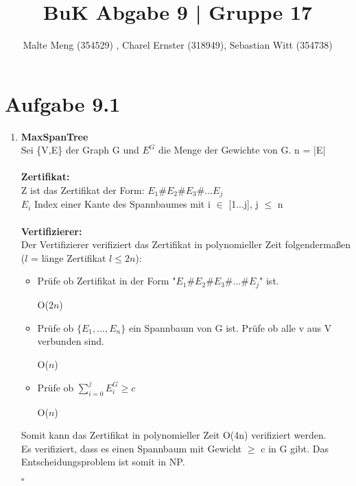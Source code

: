 \documentclass{article}
\title{BuK Abgabe 9 | Gruppe 17}
\author{Malte Meng (354529) , Charel Ernster (318949), Sebastian Witt (354738)}
\begin{document}
	\maketitle 
	\section[a 9.1]{Aufgabe 9.1}
	\begin{enumerate}[label=(\alph*).]
		\item \textbf{MaxSpanTree}\\
		Sei \{V,E\} der Graph G und $E^G$ die Menge der Gewichte von G. n = |E|\\\\
		\textbf{Zertifikat:}\\
		Z ist das Zertifikat der Form: $E_1\#E_2\#E_3\#...E_j$\\
		$E_i$ Index einer Kante des Spannbaumes mit i $\in$ [1...j], j $\leq$ n\\\\
		\textbf{Vertifizierer:}\\
		Der Vertifizierer verifiziert das Zertifikat in polynomieller Zeit folgendermaßen ($l$ = länge Zertifikat $l \leq 2n$):\\
		\begin{itemize}
			\item Prüfe ob Zertifikat in der Form "$E_1\#E_2\#E_3\#...\#E_j$" ist. \begin{flushright}O($2n$)\end{flushright}
			\item Prüfe ob $\{E_1,...,E_n\}$ ein Spannbaum von G ist. Prüfe ob alle v aus V verbunden sind. 
			\begin{flushright}O($n$)\end{flushright}
			\item Prüfe ob $\sum_{i=0}^{j}E^G_i \geq c$ 
			\begin{flushright}O($n$)\end{flushright}
		\end{itemize}
		Somit kann das Zertifikat in polynomieller Zeit O(4n) verifiziert werden.\\
		Es verifiziert, dass es einen Spannbaum mit Gewicht $\geq$ c in G gibt.
		Das Entscheidungsproblem ist somit in NP.\begin{flushright}$\square$\end{flushright}
		

\end{enumerate}
\end{document}

